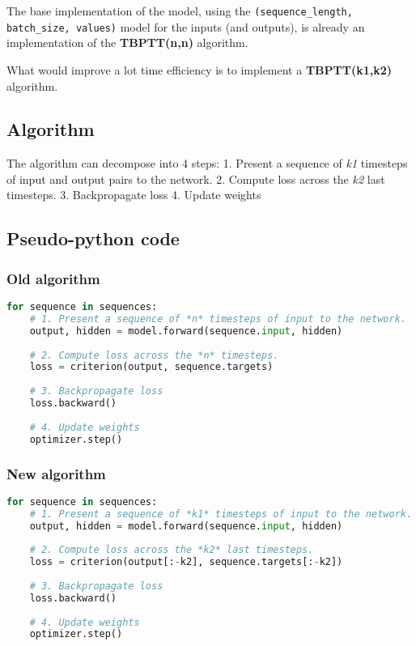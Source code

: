 The base implementation of the model, using the
\lstinline!(sequence_length, batch_size, values)! model for the inputs
(and outputs), is already an implementation of the \textbf{TBPTT(n,n)}
algorithm.

What would improve a lot time efficiency is to implement a
\textbf{TBPTT(k1,k2)} algorithm.

\subsection{Algorithm}\label{algorithm}

The algorithm can decompose into 4 steps: 1. Present a sequence of
\emph{k1} timesteps of input and output pairs to the network. 2. Compute
loss across the \emph{k2} last timesteps. 3. Backpropagate loss 4.
Update weights

\subsection{Pseudo-python code}\label{pseudo-python-code}

\subsubsection{Old algorithm}\label{old-algorithm}

\begin{lstlisting}[language=Python]
for sequence in sequences:
    # 1. Present a sequence of *n* timesteps of input to the network.
    output, hidden = model.forward(sequence.input, hidden)
    
    # 2. Compute loss across the *n* timesteps.
    loss = criterion(output, sequence.targets)
    
    # 3. Backpropagate loss
    loss.backward()
    
    # 4. Update weights
    optimizer.step()
\end{lstlisting}

\subsubsection{New algorithm}\label{new-algorithm}

\begin{lstlisting}[language=Python]
for sequence in sequences:
    # 1. Present a sequence of *k1* timesteps of input to the network.
    output, hidden = model.forward(sequence.input, hidden)
    
    # 2. Compute loss across the *k2* last timesteps.
    loss = criterion(output[:-k2], sequence.targets[:-k2])
    
    # 3. Backpropagate loss
    loss.backward()
    
    # 4. Update weights
    optimizer.step()
\end{lstlisting}

